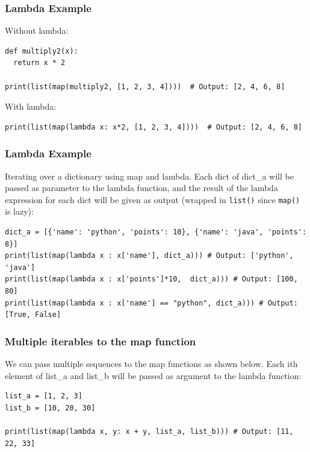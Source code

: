\begin{frame}[fragile]\frametitle{Lambda Example}
Without lambda:
	    \begin{lstlisting}
def multiply2(x):
  return x * 2

print(list(map(multiply2, [1, 2, 3, 4])))  # Output: [2, 4, 6, 8]
\end{lstlisting}
With lambda:
	    \begin{lstlisting}
print(list(map(lambda x: x*2, [1, 2, 3, 4])))  # Output: [2, 4, 6, 8]
\end{lstlisting}
\end{frame}

\begin{frame}[fragile]\frametitle{Lambda Example}
Iterating over a dictionary using map and lambda. Each dict of dict\_a will be passed as
parameter to the lambda function, and the result of the lambda expression for each dict will be
given as output (wrapped in \lstinline|list()| since \lstinline|map()| is lazy):
	    \begin{lstlisting}
dict_a = [{'name': 'python', 'points': 10}, {'name': 'java', 'points': 8}]
print(list(map(lambda x : x['name'], dict_a))) # Output: ['python', 'java']
print(list(map(lambda x : x['points']*10,  dict_a))) # Output: [100, 80]
print(list(map(lambda x : x['name'] == "python", dict_a))) # Output: [True, False]
\end{lstlisting}
\end{frame}

\begin{frame}[fragile]\frametitle{Multiple iterables to the map function}
We can pass multiple sequences to the map functions as shown below. Each ith element of list\_a
and list\_b will be passed as argument to the lambda function:
	    \begin{lstlisting}
list_a = [1, 2, 3]
list_b = [10, 20, 30]

print(list(map(lambda x, y: x + y, list_a, list_b))) # Output: [11, 22, 33]
\end{lstlisting}
\end{frame}

